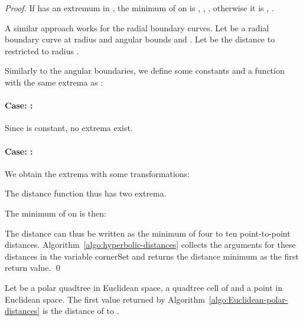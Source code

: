 \documentclass{llncs}
\begin{document}
\begin{proof}
If  has an extremum  in , the minimum of  on  is ,  , ,
otherwise it is ,  .

\vspace{1\baselineskip}
A similar approach works for the radial boundary curves. Let  be a radial boundary curve at radius  and angular bounds  and .
Let  be the distance to  restricted to radius .

Similarly to the angular boundaries, we define some constants and a function  with the same extrema as :


\paragraph*{Case: :}

Since  is constant, no extrema exist.

\paragraph*{Case: :}
We obtain the extrema with some transformations:

The distance function  thus has two extrema.

The minimum of  on  is then:


The distance  can thus be written as the minimum of four to ten point-to-point distances. 
Algorithm~\ref{algo:hyperbolic-distances} collects the arguments for these distances in the variable cornerSet and returns the distance minimum as the first return value.
\qed
\end{proof}


\begin{lemma}
 Let  be a polar quadtree in Euclidean space,  a quadtree cell of  and  a point in Euclidean space.
 The first value returned by Algorithm~\ref{algo:Euclidean-polar-distances} is the distance of  to .
 \label{lemma:Euclidean-polar-distances}
\end{lemma}
\end{document}
